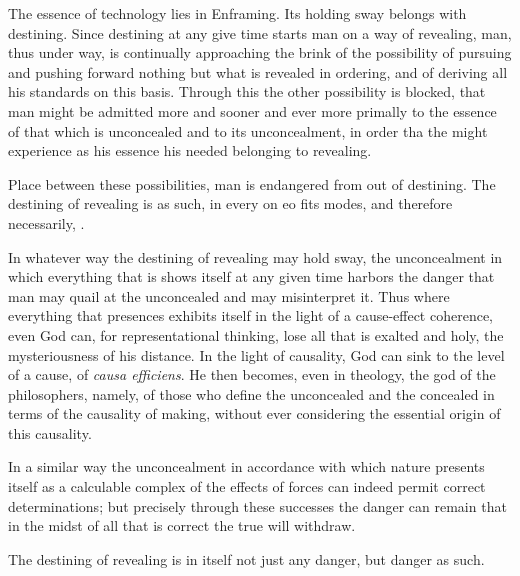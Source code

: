 The essence of technology lies in Enframing. Its holding sway belongs with destining. Since destining at any give time starts man on a way of revealing, man, thus under way, is continually approaching the brink of the possibility of pursuing and pushing forward nothing but what is revealed in ordering, and of deriving all his standards on this basis. Through this the other possibility is blocked, that man might be admitted more and sooner and ever more primally to the essence of that which is unconcealed and to its unconcealment, in order tha the might experience as his essence his needed belonging to revealing.

Place between these possibilities, man is endangered from out of destining. The destining of revealing is as such, in every on eo fits modes, and therefore necessarily, .

In whatever way the destining of revealing may hold sway, the unconcealment in which everything that is shows itself at any given time harbors the danger that man may quail at the unconcealed and may misinterpret it. Thus where everything that presences exhibits itself in the light of a cause-effect coherence, even God can, for representational thinking, lose all that is exalted and holy, the mysteriousness of his distance. In the light of causality, God can sink to the level of a cause, of \textit{causa efficiens}. He then becomes, even in theology, the god of the philosophers, namely, of those who define the unconcealed and the concealed in terms of the causality of making, without ever considering the essential origin of this causality.

In a similar way the unconcealment in accordance with which nature presents itself as a calculable complex of the effects of forces can indeed permit correct determinations; but precisely through these successes the danger can remain that in the midst of all that is correct the true will withdraw.

The destining of revealing is in itself not just any danger, but danger as such.

